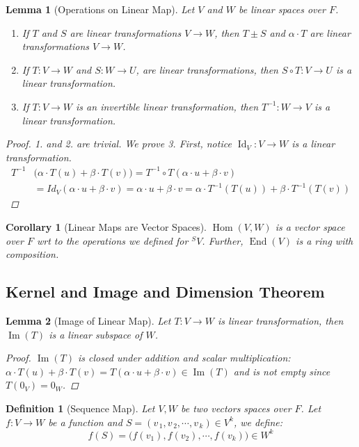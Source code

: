 \documentclass[12pt]{article}
\newcommand{\seq}[2]{\left({#1}_{\,1},{#1}_{\,2},\cdots,{#1}_{\,#2}\right)}
\DeclareMathOperator{\Image}{Im}
\DeclareMathOperator{\Id}{Id}
\DeclareMathOperator{\Hom}{Hom}
\newtheorem{definition}{Definition}[subsection]
\newtheorem{lemma}{Lemma}[subsection]
\newtheorem{corollary}{Corollary}[subsection]
\begin{document}
\begin{lemma}[Operations on Linear Map]
  Let $V$ and $W$ be linear spaces over $F$.
  \begin{enumerate}
    \item If $T$ and $S$ are linear transformations $V\to W$, then $T\pm S$ and $\alpha\cdot T$ are linear transformations $V\to W$.
    \item If $T: V\to W$ and $S: W\to U$, are linear transformations, then $S\circ T: V\to U$ is a linear transformation.
    \item If $T: V\to W$ is an invertible linear transformation, then $T^{-1}: W\to V$ is a linear transformation.
  \end{enumerate}
  \begin{proof}
    1. and 2. are trivial. We prove 3. First, notice $\Id_V: V\to W$ is a linear transformation.
    \begin{align*}
      T^{-1}&\big(\alpha\cdot T(u)+\beta\cdot T(v)\big)=T^{-1}\circ T(\alpha\cdot u+\beta\cdot v)\\
      &=Id_V(\alpha\cdot u+\beta\cdot v)=\alpha\cdot u+\beta\cdot v
      = \alpha\cdot T^{-1}(T(u))+\beta\cdot T^{-1}(T(v))
    \end{align*}
  \end{proof}
\end{lemma}

\begin{corollary}[Linear Maps are Vector Spaces]
  $\Hom(V, W)$ is a vector space over $F$ wrt to the operations we defined for ${}^S V$. Further, $\operatorname{End}(V)$ is a ring with composition.
\end{corollary}

\subsection{Kernel and Image and Dimension Theorem}

\begin{lemma}[Image of Linear Map]
  Let $T: V\to W$ is linear transformation, then $\Image(T)$ is a linear subspace of $W$.
  \begin{proof}
    $\Image(T)$ is closed under addition and scalar multiplication: $\alpha\cdot T(u)+\beta\cdot T(v)=T(\alpha\cdot u+\beta\cdot v)\in\Image(T)$ and is not empty since $T(0_V)=0_W$.
  \end{proof}
\end{lemma}

\begin{definition}[Sequence Map]
  Let $V,W$ be two vectors spaces over $F$. Let $f:V\to W$ be a function and $S=\seq{v}{k}\in V^k$, we define:
  $$f(S)=\big(f(v_1),f(v_2),\cdots,f(v_k)\big)\in W^k$$
\end{definition}
\end{document}
